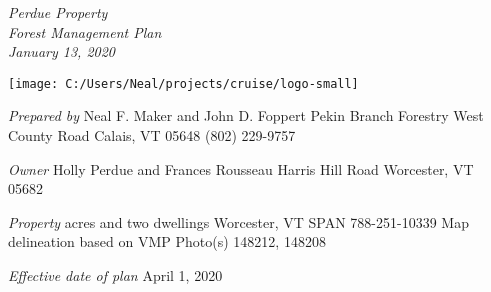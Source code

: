 \documentclass[]{tufte-handout}
\date{}
\begin{document}
\thispagestyle{empty}

\LARGE \emph{Perdue Property}\\
\Large \emph{Forest Management Plan}\\
\Large \emph{January 13, 2020}

\begin{marginfigure}

{\centering \texttt{[image: C:/Users/Neal/projects/cruise/logo-small]} 

}

\end{marginfigure}

\normalsize 

\begin{marginfigure}
\noindent \textit{\large Prepared by} 
\newline\indent Neal F. Maker and John D. Foppert  
\newline\indent Pekin Branch Forestry  
\newline{} West County Road  
\newline\indent Calais, VT 05648  
\newline\indent (802) 229-9757  
\end{marginfigure}

\begin{marginfigure}
\noindent \textit{\large Owner}
\newline\indent Holly Perdue and Frances Rousseau  
\newline{} Harris Hill Road
\indent 
\newline\indent Worcester, VT 05682  
\end{marginfigure}

\begin{marginfigure}
\noindent \textit{\large Property}   
\newline{} acres and two dwellings   
\newline\indent Worcester, VT  
\newline\indent SPAN 788-251-10339  
\newline\indent Map delineation based on VMP  
\newline\indent Photo(s) 148212, 148208  
\end{marginfigure}

\begin{marginfigure}
\noindent \textit{\large Effective date of plan}  
\newline\indent April 1, 2020  
\end{marginfigure}
\end{document}
